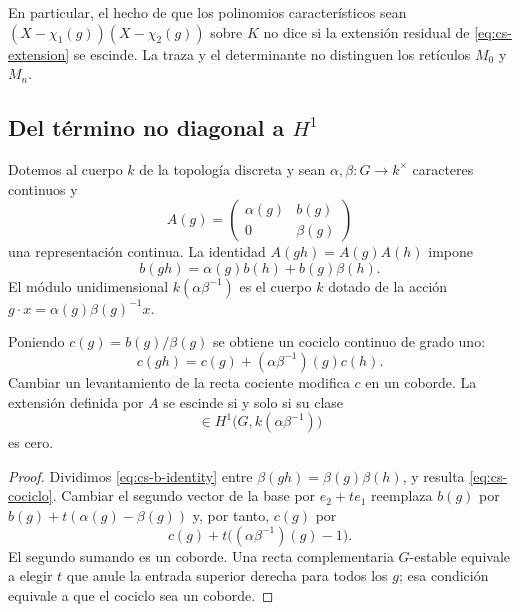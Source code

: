 En particular, el hecho de que los polinomios característicos
sean $(X-\chi_1(g))(X-\chi_2(g))$ sobre $K$
no dice si la extensión residual de \eqref{eq:cs-extension}
se escinde. La traza y el determinante no distinguen los
retículos $M_0$ y $M_n$.

\subsection{Del término no diagonal a \texorpdfstring{$H^1$}{H1}}

Dotemos al cuerpo $k$ de la topología discreta y sean
$\alpha,\beta:G\to k^\times$ caracteres continuos y
\begin{equation}
 A(g)=\begin{pmatrix}\alpha(g)&b(g)\\0&\beta(g)\end{pmatrix}
 \label{eq:cs-upper-triangular}
\end{equation}
una representación continua. La identidad $A(gh)=A(g)A(h)$
impone
\begin{equation}
 b(gh)=\alpha(g)b(h)+b(g)\beta(h).
 \label{eq:cs-b-identity}
\end{equation}
El módulo unidimensional
$k(\alpha\beta^{-1})$ es el cuerpo $k$ dotado de la acción
$g\cdot x=\alpha(g)\beta(g)^{-1}x$.

\begin{lema}
\label{lem:cs-cociclo}
Poniendo $c(g)=b(g)/\beta(g)$ se obtiene un cociclo
continuo de grado uno:
\begin{equation}
 c(gh)=c(g)+(\alpha\beta^{-1})(g)c(h).
 \label{eq:cs-cociclo}
\end{equation}
Cambiar un levantamiento de la recta cociente modifica
$c$ en un coborde. La extensión definida por $A$ se
escinde si y solo si su clase
\begin{equation}
 [c]\in H^1\bigl(G,k(\alpha\beta^{-1})\bigr)
 \label{eq:cs-H1}
\end{equation}
es cero.
\end{lema}

\begin{proof}
Dividimos \eqref{eq:cs-b-identity} entre
$\beta(gh)=\beta(g)\beta(h)$, y resulta
\eqref{eq:cs-cociclo}. Cambiar el segundo vector de la base
por $e_2+t e_1$ reemplaza $b(g)$ por
$b(g)+t(\alpha(g)-\beta(g))$ y, por tanto, $c(g)$ por
\[
 c(g)+t\bigl((\alpha\beta^{-1})(g)-1\bigr).
\]
El segundo sumando es un coborde. Una recta complementaria
$G$-estable equivale a elegir $t$ que anule la entrada
superior derecha para todos los $g$; esa condición equivale
a que el cociclo sea un coborde.
\end{proof}

